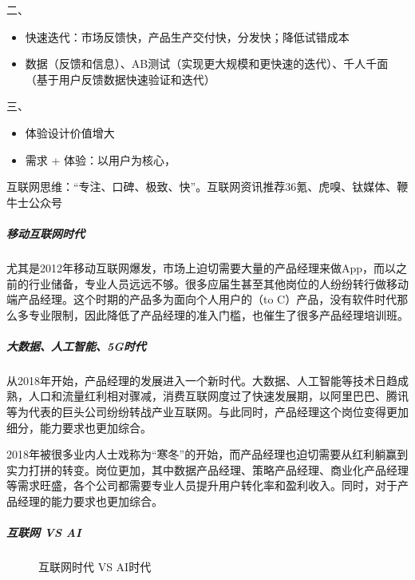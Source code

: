 \documentclass[letterpaper,10pt,english]{sphinxmanual}
\begin{document}
二、
\begin{itemize}
\item {} 
快速迭代：市场反馈快，产品生产交付快，分发快；降低试错成本

\item {} 
数据（反馈和信息）、AB测试（实现更大规模和更快速的迭代）、千人千面（基于用户反馈数据快速验证和迭代）

\end{itemize}

三、
\begin{itemize}
\item {} 
体验设计价值增大

\item {} 
需求 + 体验：以用户为核心，

\end{itemize}

互联网思维：“专注、口碑、极致、快”。互联网资讯推荐36氪、虎嗅、钛媒体、鞭牛士公众号


\subparagraph{移动互联网时代}
\label{\detokenize{chapter_introduction/AI_PM:id4}}
尤其是2012年移动互联网爆发，市场上迫切需要大量的产品经理来做App，而以之前的行业储备，专业人员远远不够。很多应届生甚至其他岗位的人纷纷转行做移动端产品经理。这个时期的产品多为面向个人用户的（to
C）产品，没有软件时代那么多专业限制，因此降低了产品经理的准入门槛，也催生了很多产品经理培训班。


\subparagraph{大数据、人工智能、5G时代}
\label{\detokenize{chapter_introduction/AI_PM:g}}
从2018年开始，产品经理的发展进入一个新时代。大数据、人工智能等技术日趋成熟，人口和流量红利相对骤减，消费互联网度过了快速发展期，以阿里巴巴、腾讯等为代表的巨头公司纷纷转战产业互联网。与此同时，产品经理这个岗位变得更加细分，能力要求也更加综合。

2018年被很多业内人士戏称为“寒冬”的开始，而产品经理也迫切需要从红利躺赢到实力打拼的转变。岗位更加，其中数据产品经理、策略产品经理、商业化产品经理等需求旺盛，各个公司都需要专业人员提升用户转化率和盈利收入。同时，对于产品经理的能力要求也更加综合。


\subparagraph{互联网 VS AI}
\label{\detokenize{chapter_introduction/AI_PM:vs-ai}}
\begin{figure}[H]
\centering
\capstart

\noindent{}
\caption{互联网时代 VS AI时代\sphinxfootnotemark[263]}\label{\detokenize{chapter_introduction/AI_PM:id47}}\end{figure}
%
\begin{footnotetext}[263]\sphinxAtStartFootnote
{}
%
\end{footnotetext}\ignorespaces 
\end{document}
